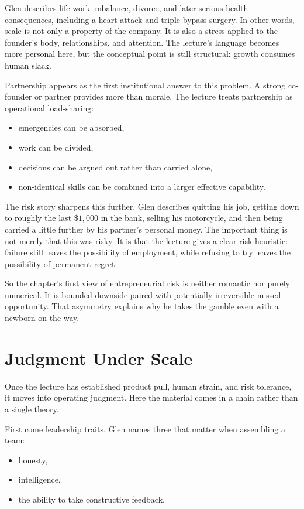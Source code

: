 Glen describes life-work imbalance, divorce, and later serious health consequences, including a heart attack and triple bypass surgery. In other words, scale is not only a property of the company. It is also a stress applied to the founder's body, relationships, and attention. The lecture's language becomes more personal here, but the conceptual point is still structural: growth consumes human slack.

Partnership appears as the first institutional answer to this problem. A strong co-founder or partner provides more than morale. The lecture treats partnership as operational load-sharing:
\begin{itemize}
\item emergencies can be absorbed,
\item work can be divided,
\item decisions can be argued out rather than carried alone,
\item non-identical skills can be combined into a larger effective capability.
\end{itemize}

The risk story sharpens this further. Glen describes quitting his job, getting down to roughly the last \(\$1{,}000\) in the bank, selling his motorcycle, and then being carried a little further by his partner's personal money. The important thing is not merely that this was risky. It is that the lecture gives a clear risk heuristic: failure still leaves the possibility of employment, while refusing to try leaves the possibility of permanent regret.

So the chapter's first view of entrepreneurial risk is neither romantic nor purely numerical. It is bounded downside paired with potentially irreversible missed opportunity. That asymmetry explains why he takes the gamble even with a newborn on the way.

\section{Judgment Under Scale}

Once the lecture has established product pull, human strain, and risk tolerance, it moves into operating judgment. Here the material comes in a chain rather than a single theory.

First come leadership traits. Glen names three that matter when assembling a team:
\begin{itemize}
\item honesty,
\item intelligence,
\item the ability to take constructive feedback.
\end{itemize}

